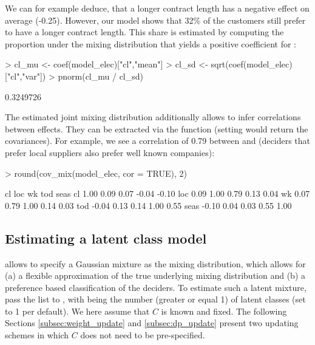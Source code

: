 \documentclass[article,shortnames]{jss}
\newcommand{\fct}[1]{\code{#1()}}
\begin{document}
We can for example deduce, that a longer contract length has a negative effect on average (-0.25). However, our model shows that 32\% of the customers still prefer to have a longer contract length. This share is estimated by computing the proportion under the mixing distribution that yields a positive coefficient for :

\begin{Schunk}
\begin{Sinput}
> cl_mu <- coef(model_elec)["cl","mean"]
> cl_sd <- sqrt(coef(model_elec)["cl","var"])
> pnorm(cl_mu / cl_sd)
\end{Sinput}
\begin{Soutput}
[1] 0.3249726
\end{Soutput}
\end{Schunk}

The estimated joint mixing distribution additionally allows to infer correlations between effects. They can be extracted via the \fct{cov\_mix} function (setting  would return the covariances). For example, we see a correlation of 0.79 between  and  (deciders that prefer local suppliers also prefer well known companies):

\begin{Schunk}
\begin{Sinput}
> round(cov_mix(model_elec, cor = TRUE), 2)
\end{Sinput}
\begin{Soutput}
        cl  loc   wk   tod  seas
cl    1.00 0.09 0.07 -0.04 -0.10
loc   0.09 1.00 0.79  0.13  0.04
wk    0.07 0.79 1.00  0.14  0.03
tod  -0.04 0.13 0.14  1.00  0.55
seas -0.10 0.04 0.03  0.55  1.00
\end{Soutput}
\end{Schunk}

\subsection{Estimating a latent class model} \label{subsec:latent_classes}

 allows to specify a Gaussian mixture as the mixing distribution, which allows for (a) a flexible approximation of the true underlying mixing distribution and (b) a preference based classification of the deciders. To estimate such a latent mixture, pass the list  to \fct{fit\_model}, with  being the number (greater or equal 1) of latent classes (set to 1 per default). We here assume that $C$ is known and fixed. The following Sections \ref{subsec:weight_update} and \ref{subsec:dp_update} present two updating schemes in which $C$ does not need to be pre-specified.
\end{document}
